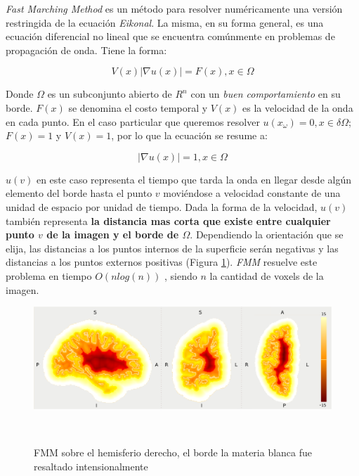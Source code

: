 \textit{Fast Marching Method} es un m\'etodo para resolver num\'ericamente una
versi\'on restringida de la ecuaci\'on \textit{Eikonal}. La misma, en su forma
general, es una ecuaci\'on diferencial no lineal que se encuentra com\'unmente 
en problemas de propagaci\'on de onda. Tiene la forma: 

$$ V(x) | \nabla u(x) | = F(x) , x \in \Omega $$ 

Donde $\Omega$ es un subconjunto abierto de $R^n$ con un
\textit{buen comportamiento} en su borde. $F(x)$ se denomina el costo temporal y
$V(x)$ es la velocidad de la onda en cada punto. En el caso particular que
queremos resolver $u(x_\omega) = 0, x \in \delta\Omega$;  $F(x)=1$ y $V(x)=1$,
por lo que la ecuaci\'on se resume a:

$$ | \nabla u(x) | = 1 , x \in \Omega $$ 

$u(v)$ en este caso representa el tiempo que tarda la onda en llegar desde
alg\'un elemento del borde hasta el punto $v$ movi\'endose a velocidad constante
de una unidad de espacio por unidad de tiempo. Dada la forma de la velocidad, 
$u(v)$ tambi\'en representa \textbf{la distancia mas corta que existe entre cualquier
punto $v$ de la imagen y el borde de $\Omega$}. Dependiendo la orientaci\'on que 
se elija, las distancias a los puntos internos de la superficie ser\'an negativas
y las distancias a los puntos externos positivas (Figura \ref{fig:fmm}). 
\textit{FMM} resuelve este problema en tiempo $O(n log(n))$ \cite{Sethian2001},
siendo $n$ la cantidad de voxels de la imagen.\\

\begin{figure}[h!]

\centering
\begin{minipage}[b]{0.7\textwidth}
    \includegraphics[width=\textwidth]{img/fmm.png}
    \caption{\small FMM sobre el hemisferio derecho, el borde la materia blanca fue
    resaltado intensionalmente}
    \label{fig:fmm}
\end{minipage} ~

\end{figure}  

